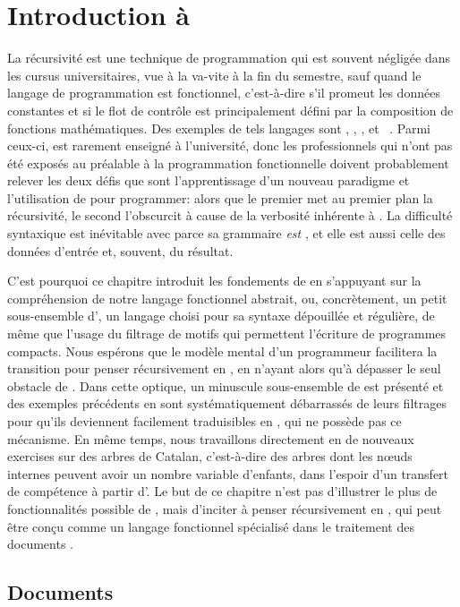 \chapter{Introduction à \XSLT}

La récursivité est une technique de programmation qui est souvent
négligée dans les cursus universitaires, vue à la va-vite à la fin du
semestre, sauf quand le langage de programmation est fonctionnel,
c'est-à-dire s'il promeut les données constantes et si le flot de
contrôle est principalement défini par la composition de fonctions
mathématiques. Des exemples de tels langages sont \Scheme, \Haskell,
\OCaml, \Erlang et \XSLT~\citep{Kay_2008}. Parmi ceux-ci, \XSLT est
rarement enseigné à l'université, donc les professionnels qui n'ont
pas été exposés au préalable à la programmation fonctionnelle doivent
probablement relever les deux défis que sont l'apprentissage d'un
nouveau paradigme et l'utilisation de \XML pour programmer: alors que
le premier met au premier plan la récursivité, le second l'obscurcit à
cause de la verbosité inhérente à \XML. La difficulté syntaxique est
inévitable avec \XSLT parce sa grammaire \emph{est} \XML, et elle est
aussi celle des données d'entrée et, souvent, du résultat.

C'est pourquoi ce chapitre introduit les fondements de \XSLT en
s'appuyant sur la compréhension de notre langage fonctionnel abstrait,
ou, concrètement, un petit sous-ensemble d'\Erlang, un langage choisi
pour sa syntaxe dépouillée et régulière, de même que l'usage du
filtrage de motifs qui permettent l'écriture de programmes
compacts. Nous espérons que le modèle mental d'un programmeur \Erlang
facilitera la transition pour penser récursivement en \XSLT, en
n'ayant alors qu'à dépasser le seul obstacle de \XML. Dans cette
optique, un minuscule sous-ensemble de \XSLT est présenté et des
exemples précédents en \Erlang sont systématiquement débarrassés de
leurs filtrages pour qu'ils deviennent facilement traduisibles en
\XSLT, qui ne possède pas ce mécanisme. En même temps, nous
travaillons directement en \XSLT de nouveaux exercises sur des arbres
de Catalan, c'est-à-dire des arbres dont les nœuds internes
peuvent avoir un nombre variable d'enfants, dans l'espoir d'un
transfert de compétence à partir d'\Erlang. Le but de ce chapitre
n'est pas d'illustrer le plus de fonctionnalités possible de \XSLT,
mais d'inciter à penser récursivement en \XSLT, qui peut être conçu
comme un langage fonctionnel spécialisé dans le traitement des
documents \XML.


\section{Documents}

